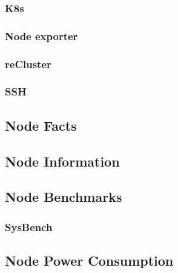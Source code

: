 \subsubsection{K8s}
\label{subsubsec:implementation_installer_configuration_filesn_k8s}

\subsubsection{Node exporter}
\label{subsubsec:implementation_installer_configuration_files_node_exporter}

\subsubsection{reCluster}
\label{subsubsec:implementation_installer_configuration_files_recluster}

\subsubsection{SSH}
\label{subsubsec:implementation_installer_configuration_files_ssh}

\subsection{Node Facts}
\label{subsec:implementation_installer_node_facts}

\subsection{Node Information}
\label{subsec:implementation_installer_node_information}

\subsection{Node Benchmarks}
\label{subsec:implementation_installer_node_benchmarks}

\subsubsection{SysBench}
\label{subsubsec:implementation_installer_node_benchmarks_sysbench}

\subsection{Node Power Consumption}
\label{subsec:implementation_installer_node_power_consumption}

